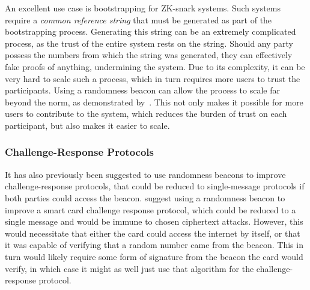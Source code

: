 An excellent use case is bootstrapping for ZK-snark systems. Such systems require a \emph{common reference string} that must be generated as part of the bootstrapping process. Generating this string can be an extremely complicated process, as the trust of the entire system rests on the string. Should any party possess the numbers from which the string was generated, they can effectively fake proofs of anything, undermining the system. Due to its complexity, it can be very hard to scale such a process, which in turn requires more users to trust the participants. Using a randomness beacon can allow the process to scale far beyond the norm, as demonstrated by~\citet{mpcsnarks}. This not only makes it possible for more users to contribute to the system, which reduces the burden of trust on each participant, but also makes it easier to scale.

\subsubsection{Challenge-Response Protocols}
It has also previously been suggested to use randomness beacons to improve challenge-response protocols, that could be reduced to single-message protocols if both parties could access the beacon.
\citet{fischer2011publicrandomnessservice} suggest using a randomness beacon to improve a smart card challenge response protocol, which could be reduced to a single message and would be immune to chosen ciphertext attacks. However, this would necessitate that either the card could access the internet by itself, or that it was capable of verifying that a random number came from the beacon. This in turn would likely require some form of signature from the beacon the card would verify, in which case it might as well just use that algorithm for the challenge-response protocol. %





